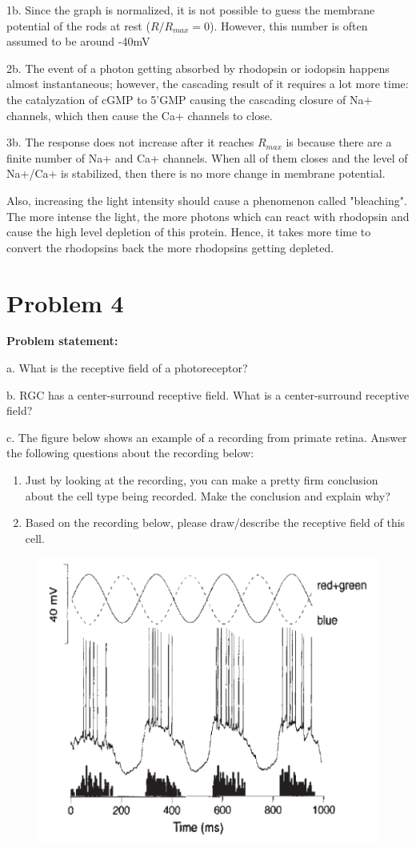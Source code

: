 \documentclass[letterpaper, 11pt]{article}
\begin{document}
1b. Since the graph is normalized, it is not possible to guess the membrane potential of the rods at rest ($R/R_{max} = 0$). However, this number is often assumed to be around -40mV

2b. The event of a photon getting absorbed by rhodopsin or iodopsin happens almost instantaneous; however, the cascading result of it requires a lot more time: the catalyzation of cGMP to 5'GMP causing the cascading closure of Na+ channels, which then cause the Ca+ channels to close.

3b. The response does not increase after it reaches $R_{max}$ is because there are a finite number of Na+ and Ca+ channels. When all of them closes and the level of Na+/Ca+ is stabilized, then there is no more change in membrane potential. 

Also, increasing the light intensity should cause a phenomenon called "bleaching". The more intense the light, the more photons which can react with rhodopsin and cause the high level depletion of this protein. Hence, it takes more time to convert the rhodopsins back the more rhodopsins getting depleted.

\section{Problem 4}
\label{sec:prob4}
\textbf{Problem statement:} 

a. What is the receptive field of a photoreceptor?

b. RGC has a center-surround receptive field. What is a center-surround receptive field?

c. The figure below shows an example of a recording from primate retina. Answer the following questions about the recording below:
\begin{enumerate}
	\item Just by looking at the recording, you can make a pretty firm conclusion about the cell type being recorded. Make the conclusion and explain why?
	\item Based on the recording below, please draw/describe the receptive field of this cell.
\end{enumerate}

\begin{figure}[htb!]
	\centering
	\includegraphics[width=0.7\linewidth]{3_fig.png}
	\label{fig3}
\end{figure}
\end{document}
